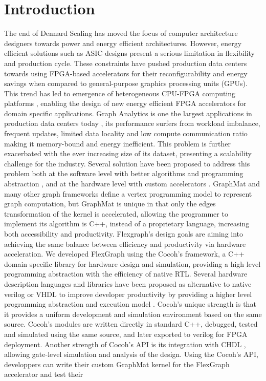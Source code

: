 \section{Introduction}

The end of Dennard Scaling \cite{Dark-Silicon} has moved the focus of computer architecture designers towards power and energy efficient architectures. However, energy efficient solutions such as ASIC designs present a serious limitation in flexibility and production cycle. These constraints have pushed production data centers towards using FPGA-based accelerators \cite{Catapult} for their reconfigurability and energy savings when compared to general-purpose graphics processing units (GPUs).
This trend has led to emergence of heterogeneous CPU-FPGA computing platforms \cite{Intel-FPGA} \cite{IBM-FPGA}, enabling the design of new energy efficient FPGA accelerators for domain specific applications. Graph Analytics is one the largest applications in production data centers today \cite{BigData}, its performance surfers from workload imbalance, frequent updates, limited data locality and low compute communication ratio making it memory-bound and energy inefficient. This problem is further exacerbated with the ever increasing size of its dataset, presenting a scalability challenge for the industry. Several solution have been proposed to address this problem both at the software level with better algorithms and programming abstraction \cite{GraphX} \cite{Galois} \cite{GraphMat} \cite{Pregel} \cite{GraphLab}, and at the hardware level with custom accelerators \cite {Graphicionado} \cite{Tesseract} \cite{GraphOps}. GraphMat \cite{GraphMat} and many other graph frameworks \cite{GraphMat} \cite{Pregel} \cite{GraphLab} define a vertex programming model to represent graph computation, but GraphMat is unique in that only the edges transformation of the kernel is accelerated, allowing the programmer to implement its algorithm is C++, instead of a proprietary language, increasing both accessibility and productivity. Flexgraph's design goals are aiming into achieving the same balance between efficiency and productivity via hardware acceleration. We developed FlexGraph using the Cocoh's \cite{Cocoh} framework, a C++ domain specific library for hardware design and simulation, providing a high level programming abstraction with the efficiency of native RTL. Several hardware description languages and libraries \cite{CHDL} \cite{Chisel} \cite{SystemC} \cite{BlueSpec} \cite{MyHDL} \cite{JHDL} \cite{Esterel} have been proposed as alternative to native verilog or VHDL to improve developer productivity by providing a higher level programming abstraction \cite{Chisel} \cite{SystemC} and execution model \cite{BlueSpec} \cite{Esterel}. Cocoh's unique strength is that it provides a uniform development and simulation environment based on the same source. Cocoh's modules are written directly in standard C++, debugged, tested and simulated using the same source, and later exported to verilog for FPGA deployment. Another strength of Cocoh's API is its integration with CHDL \cite{CHDL}, allowing gate-level simulation and analysis of the design. Using the Cocoh's API, developpers can write their custom GraphMat kernel for the FlexGraph accelerator and test their 
